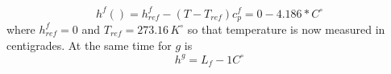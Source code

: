\begin{equation}
h^f() = h^f_{ref} -(T-T_{ref})c_p^f = 0 - 4.186*  C^\circ   
\end{equation}
where \(h_{ref}^f=0\) and \(T_{ref} = 273.16\, K^\circ\) so that temperature is now measured in centigrades.
At the same time for \(g\) is 
\begin{equation}
h^g = L_f  - 1C^\circ
\end{equation}